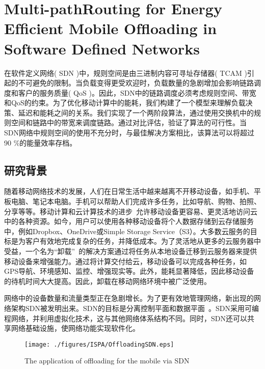 \chapter{Multi-pathRouting for Energy Efﬁcient Mobile Ofﬂoading in Software Deﬁned Networks}

在软件定义网络( SDN )中，规则空间是由三进制内容可寻址存储器( TCAM )引起的不可避免的限制。当负载变得更受欢迎时，负载数量的急剧增加会影响链路调度和客户的服务质量( QoS )。因此，SDN中的链路调度必须考虑规则空间、带宽和QoS的约束。为了优化移动计算中的能耗，我们构建了一个模型来理解负载决策、延迟和能耗之间的关系。我们实现了一个两阶段算法，通过使用交换机中的规则空间和链路中的带宽来调度链路。通过对比评估，验证了算法的可行性。当SDN网络中规则空间的使用不充分时，与最佳解决方案相比，该算法可以将超过90 \%的能量效率存档。

\section{研究背景}

随着移动网络技术的发展，人们在日常生活中越来越离不开移动设备，如手机、平板电脑、笔记本电脑。手机可以帮助人们完成许多任务，比如导航、购物、拍照、分享等等。移动计算和云计算技术的进步~\cite{Lee:2013fj, Linthicum:2017vv}允许移动设备更容易、更灵活地访问云中的各种资源。如今，用户可以使用各种移动设备将个人数据存储到云存储服务中，例如Dropbox、OneDrive或Simple Storage Service（S3）。大多数云服务的目标是为客户有效地完成复杂的任务，并降低成本。为了灵活地从更多的云服务器中受益，一个名为“卸载”~\cite{Kumar:2013dq}的解决方案通过将任务从本地设备迁移到云服务器来提供移动设备来增强能力。通过将计算交付给云，移动设备可以完成各种任务，如GPS导航、环境感知、监控、增强现实等。此外，能耗显著降低，因此移动设备的待机时间大大提高。因此，卸载在移动网络环境中被广泛使用。

网络中的设备数量和流量类型正在急剧增长。为了更有效地管理网络，新出现的网络架构SDN被发明出来。SDN的目标是分离控制平面和数据平面~\cite{Committee:2012un}。SDN采用可编程网络，并利用虚拟化技术，这与其他网络体系结构不同。同时，SDN还可以共享网络基础设施，使网络功能实现软件化。

\begin{figure}[!h]
  \centering
  \texttt{[image: ./figures/ISPA/OffloadingSDN.eps]}
  \vspace{-1em}
  \caption{The application of offloading for the mobile via SDN}
  \vspace{-1em}
  \label{fig_OffloadingSDN}
\end{figure}


